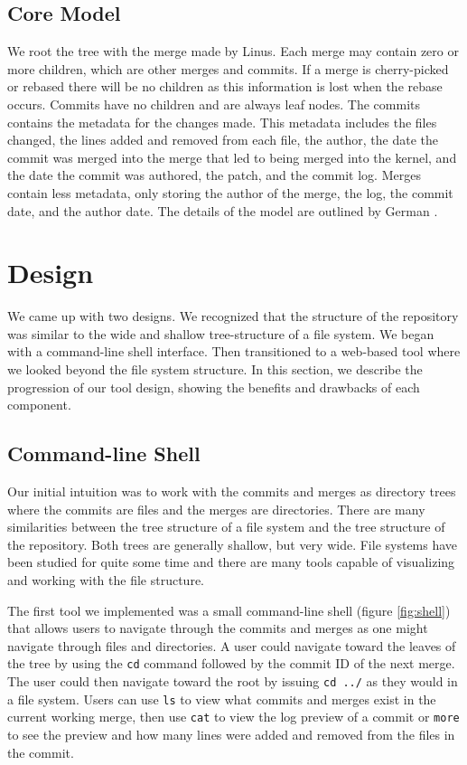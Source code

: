 \documentclass[conference, draftclsnofoot, draft]{IEEEtran}
\begin{document}
\subsection{Core Model}

We root the tree with the merge made by Linus. Each merge may contain zero or more
children, which are other merges and commits. If a merge is cherry-picked or rebased
there will be no children as this information is lost when the rebase occurs.
Commits have no children and are always leaf nodes. The commits contains the
metadata for the changes made. This metadata includes the files changed, the lines
added and removed from each file, the author, the date the commit was merged into
the merge that led to being merged into the kernel, and the date the commit was
authored, the patch, and the commit log. Merges contain less metadata, only storing
the author of the merge, the log, the commit date, and the author date. The details
of the model are outlined by German \cite{German2015}.

\section{Design}


We came up with two designs. We recognized that the structure of the repository was
similar to the wide and shallow tree-structure of a file system. We began with a
command-line shell interface. Then transitioned to a web-based tool where we looked
beyond the file system structure. In this section, we describe the progression of
our tool design, showing the benefits and drawbacks of each component.

\subsection{Command-line Shell}

Our initial intuition was to work with the commits and merges as directory trees
where the commits are files and the merges are directories. There are many
similarities between the tree structure of a file system and the tree structure of
the repository. Both trees are generally shallow, but very wide. File systems have
been studied for quite some time and there are many tools capable of visualizing and
working with the file structure.

The first tool we implemented was a small command-line shell (figure
\ref{fig:shell}) that allows users to navigate through the commits and merges as one
might navigate through files and directories. A user could navigate toward the
leaves of the tree by using the \verb|cd| command followed by the commit ID of the
next merge. The user could then navigate toward the root by issuing \verb|cd ../|
as they would in a file system. Users can use \verb|ls| to view what commits and
merges exist in the current working merge, then use \verb|cat| to view the log
preview of a commit or \verb|more| to see the preview and how many lines were added
and removed from the files in the commit.
\end{document}
